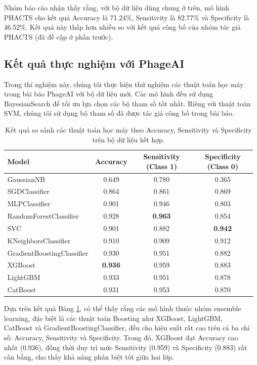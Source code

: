 Nhóm báo cáo nhận thấy rằng, với bộ dữ liệu dùng chung ở trên, mô hình PHACTS cho kết quả Accuracy là 71.24\%, Sensitivity là 82.77\% và Specificity là 46.52\%. Kết quả này thấp hơn nhiều so với kết quả công bố của nhóm tác giả PHACTS (đã đề cập ở phần trước).





\subsection{Kết quả thực nghiệm với PhageAI}
Trong thí nghiệm này, chúng tôi thực hiện thử nghiệm các thuật toán học máy trong bài báo PhageAI với bộ dữ liệu mới. Các mô hình đều sử dụng BayesianSearch để tối ưu lựa chọn các bộ tham số tốt nhất. Riêng với thuật toán SVM, chúng tôi sử dụng bộ tham số đã được tác giả công bố trong bài báo.
\begin{table}[ht]
\footnotesize
\centering
\begin{tabular}{|l|c|c|c|}
\hline
\textbf{Model} & \textbf{Accuracy} & \textbf{Sensitivity (Class 1)} & \textbf{Specificity (Class 0)} \\
\hline
GaussianNB & 0.649 & 0.780 & 0.365 \\
SGDClassifier & 0.864 & 0.861 & 0.869 \\
MLPClassifier & 0.901 & 0.946 & 0.803 \\
RandomForestClassifier & 0.928 & \textbf{0.963} & 0.854 \\
SVC & 0.901 & 0.882 & \textbf{0.942} \\
KNeighborsClassifier & 0.910 & 0.909 & 0.912 \\
GradientBoostingClassifier & 0.930 & 0.951 & 0.882 \\
XGBoost & \textbf{0.936} & 0.959 & 0.883 \\
LightGBM & 0.933 & 0.951 & 0.878 \\
CatBoost & 0.931 & 0.953 & 0.870 \\
\hline
\end{tabular}
\caption{Kết quả so sánh các thuật toán học máy theo Accuracy, Sensitivity và Specificity trên bộ dữ liệu kết hợp.}
\label{tab:model_comparison}
\end{table}

Dựa trên kết quả Bảng \ref{tab:model_comparison}, có thể thấy rằng các mô hình thuộc nhóm ensemble learning, đặc biệt là các thuật toán Boosting như XGBoost, LightGBM, CatBoost và GradientBoostingClassifier, đều cho hiệu suất rất cao trên cả ba chỉ số: Accuracy, Sensitivity và Specificity. Trong đó, XGBoost đạt Accuracy cao nhất (0.936), đồng thời duy trì mức Sensitivity (0.959) và Specificity (0.883) rất cân bằng, cho thấy khả năng phân biệt tốt giữa hai lớp.

